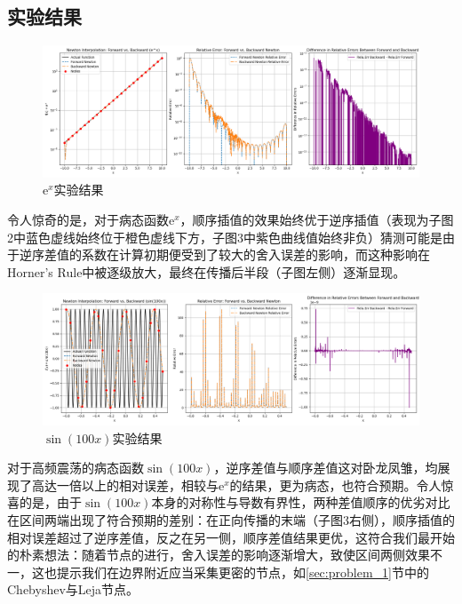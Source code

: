 \subsection{实验结果}
\begin{figure}[H]
    \centering
    \includegraphics[width=1.0\textwidth]{Problem_3/figs/exp.png}
    \caption{\(\mathrm{e}^x\)实验结果}
\end{figure}
令人惊奇的是，对于病态函数\(\mathrm{e}^x\)，顺序插值的效果始终优于逆序插值（表现为子图2中蓝色虚线始终位于橙色虚线下方，子图3中紫色曲线值始终非负）猜测可能是由于逆序差值的系数在计算初期便受到了较大的舍入误差的影响，而这种影响在Horner's Rule中被逐级放大，最终在传播后半段（子图左侧）逐渐显现。

\begin{figure}[H]
    \centering
    \includegraphics[width=1.0\textwidth]{Problem_3/figs/sin.png}
    \caption{\(\sin(100x)\)实验结果}
\end{figure}

对于高频震荡的病态函数\(\sin(100x)\)，逆序差值与顺序差值这对卧龙凤雏，均展现了高达一倍以上的相对误差，相较与\(\mathrm{e}^x\)的结果，更为病态，也符合预期。令人惊喜的是，由于\(\sin(100x)\)本身的对称性与导数有界性，两种差值顺序的优劣对比在区间两端出现了符合预期的差别：在正向传播的末端（子图3右侧），顺序插值的相对误差超过了逆序差值，反之在另一侧，顺序差值结果更优，这符合我们最开始的朴素想法：随着节点的进行，舍入误差的影响逐渐增大，致使区间两侧效果不一，这也提示我们在边界附近应当采集更密的节点，如\ref{sec:problem_1}节中的Chebyshev与Leja节点。
